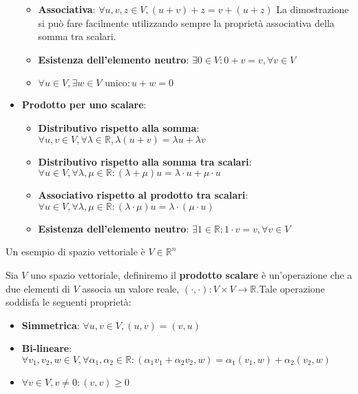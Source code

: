 \begin{itemize}
\begin{itemize}
              \item \textbf{Associativa}: $\forall u,v,z \in V, (u+v)+z = v+(u+z)$
                    La dimostrazione si può fare facilmente utilizzando sempre la proprietà
                    associativa della somma tra scalari.
              \item \textbf{Esistenza dell'elemento neutro}: $\exists 0 \in V: 0+v = v,
                        \forall v\in V$
              \item $\forall u \in V, \exists w\in V \text{ unico}: u+w=0$
          \end{itemize}
    \item \textbf{Prodotto per uno scalare}:
          \begin{itemize}
              \item \textbf{Distributivo rispetto alla somma}: $\forall u,v \in
                        V, \forall \lambda \in \mathbb{R}, \lambda(u+v) = \lambda
                        u+\lambda v$
              \item \textbf{Distributivo rispetto alla somma tra scalari}:
                    $\forall u \in V, \forall \lambda,\mu\in \mathbb{R}: (\lambda +
                        \mu)u = \lambda \cdot u + \mu \cdot u$
              \item \textbf{Associativo rispetto al prodotto tra scalari}:
                    $\forall u \in V, \forall \lambda,\mu\in \mathbb{R}: (\lambda \cdot
                        \mu)u = \lambda \cdot (\mu \cdot u)$
              \item \textbf{Esistenza dell'elemento neutro}: $\exists 1 \in
                        \mathbb{R}:1\cdot v = v, \forall v\in V$
          \end{itemize}
\end{itemize}
\begin{esempio}
    Un esempio di spazio vettoriale è $V\in \mathbb{R}^n$
\end{esempio}
\begin{definizione} 
    Sia $V$ uno spazio vettoriale, definiremo il \textbf{prodotto scalare} è un'operazione
    che a due elementi di $V$ associa un valore reale, $(\cdot, \cdot):V\times V
        \rightarrow \mathbb{R}$.Tale operazione soddisfa le seguenti proprietà:
    \begin{itemize}
        \item \textbf{Simmetrica}: $\forall u,v \in V, (u,v) = (v,u)$
        \item \textbf{Bi-lineare}: $\forall v_1,v_2,w \in V,\forall\alpha_1,
                  \alpha_2 \in \mathbb{R}:(\alpha_1v_1+\alpha_2v_2, w) =
                  \alpha_1(v_1, w) + \alpha_2(v_2, w)$
        \item $\forall v \in V, v\ne 0: (v,v) \ge 0$
    \end{itemize}
\end{definizione}
